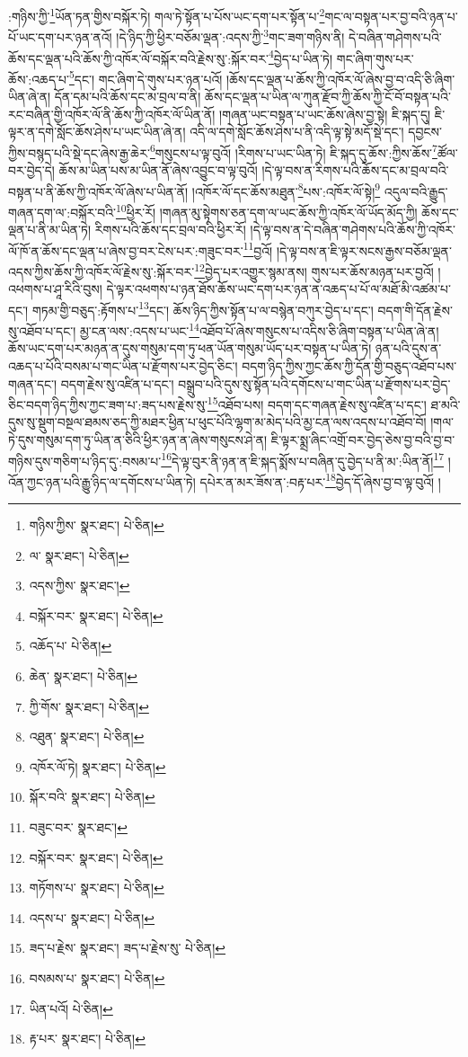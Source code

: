 :གཉིས་ཀྱི་\footnote{གཉིས་ཀྱིས་  སྣར་ཐང་།  པེ་ཅིན། }ཡོན་ཏན་གྱིས་བསྐོར་ཏེ། གལ་ཏེ་སྟོན་པ་པོས་ཡང་དག་པར་སྟོན་པ་\footnote{ལ་  སྣར་ཐང་།  པེ་ཅིན། }གང་ལ་བསྟན་པར་བྱ་བའི་ཉན་པ་པོ་ཡང་དག་པར་ཉན་ནའོ། །དེ་ཉིད་ཀྱི་ཕྱིར་བཅོམ་ལྡན་:འདས་ཀྱི་\footnote{འདས་ཀྱིས་  སྣར་ཐང་། }གང་ཟག་གཉིས་ནི། དེ་བཞིན་གཤེགས་པའི་ཆོས་དང་ལྡན་པའི་ཆོས་ཀྱི་འཁོར་ལོ་བསྐོར་བའི་རྗེས་སུ་:སྐོར་བར་\footnote{བསྐོར་བར་  སྣར་ཐང་།  པེ་ཅིན། }བྱེད་པ་ཡིན་ཏེ། གང་ཞིག་གུས་པར་ཆོས་:འཆད་པ་\footnote{འཆོད་པ་  པེ་ཅིན། }དང་། གང་ཞིག་དེ་གུས་པར་ཉན་པའོ། །ཆོས་དང་ལྡན་པ་ཆོས་ཀྱི་འཁོར་ལོ་ཞེས་བྱ་བ་འདི་ཅི་ཞིག་ཡིན་ཞེ་ན། དོན་དམ་པའི་ཆོས་དང་མ་བྲལ་བ་ནི། ཆོས་དང་ལྡན་པ་ཡིན་ལ་ཀུན་རྫོབ་ཀྱི་ཆོས་ཀྱི་ངོ་བོ་བསྟན་པའི་རང་བཞིན་གྱི་འཁོར་ལོ་ནི་ཆོས་ཀྱི་འཁོར་ལོ་ཡིན་ནོ། །གཞན་ཡང་བསྟན་པ་ཡང་ཆོས་ཞེས་བྱ་སྟེ། ཇི་སྐད་དུ། ཇི་ལྟར་ན་དགེ་སློང་ཆོས་ཤེས་པ་ཡང་ཡིན་ཞེ་ན། འདི་ལ་དགེ་སློང་ཆོས་ཤེས་པ་ནི་འདི་ལྟ་སྟེ་མདོ་སྡེ་དང་། དབྱངས་ཀྱིས་བསྙད་པའི་སྡེ་དང་ཞེས་རྒྱ་ཆེར་\footnote{ཆེན་  སྣར་ཐང་།  པེ་ཅིན། }གསུངས་པ་ལྟ་བུའོ། །རིགས་པ་ཡང་ཡིན་ཏེ། ཇི་སྐད་དུ་ཆོས་:ཀྱིས་ཆོས་\footnote{ཀྱི་གོས་  སྣར་ཐང་།  པེ་ཅིན། }ཚོལ་བར་བྱེད་དེ། ཆོས་མ་ཡིན་པས་མ་ཡིན་ནོ་ཞེས་འབྱུང་བ་ལྟ་བུའོ། །དེ་ལྟ་བས་ན་རིགས་པའི་ཆོས་དང་མ་བྲལ་བའི་བསྟན་པ་ནི་ཆོས་ཀྱི་འཁོར་ལོ་ཞེས་པ་ཡིན་ནོ། །འཁོར་ལོ་དང་ཆོས་མཐུན་\footnote{འཐུན་  སྣར་ཐང་།  པེ་ཅིན། }པས་:འཁོར་ལོ་སྟེ།\footnote{འཁོར་ལོ་ཏེ།  སྣར་ཐང་།  པེ་ཅིན། } འདུལ་བའི་རྒྱུད་གཞན་དག་ལ་:བསྐོར་བའི་\footnote{སྐོར་བའི་  སྣར་ཐང་།  པེ་ཅིན། }ཕྱིར་རོ། །གཞན་མུ་སྟེགས་ཅན་དག་ལ་ཡང་ཆོས་ཀྱི་འཁོར་ལོ་ཡོད་མོད་ཀྱི། ཆོས་དང་ལྡན་པ་ནི་མ་ཡིན་ཏེ། རིགས་པའི་ཆོས་དང་བྲལ་བའི་ཕྱིར་རོ། །དེ་ལྟ་བས་ན་དེ་བཞིན་གཤེགས་པའི་ཆོས་ཀྱི་འཁོར་ལོ་ཁོ་ན་ཆོས་དང་ལྡན་པ་ཞེས་བྱ་བར་ངེས་པར་:གཟུང་བར་\footnote{བཟུང་བར་  སྣར་ཐང་། }བྱའོ། །དེ་ལྟ་བས་ན་ཇི་ལྟར་སངས་རྒྱས་བཅོམ་ལྡན་འདས་ཀྱིས་ཆོས་ཀྱི་འཁོར་ལོ་རྗེས་སུ་:སྐོར་བར་\footnote{བསྐོར་བར་  སྣར་ཐང་།  པེ་ཅིན། }བྱེད་པར་འགྱུར་སྙམ་ནས། གུས་པར་ཆོས་མཉན་པར་བྱའོ། །འཕགས་པ་ཤཱ་རིའི་བུས། དེ་ལྟར་འཕགས་པ་ཉན་ཐོས་ཆོས་ཡང་དག་པར་ཉན་ན་འཆད་པ་པོ་ལ་མཐོ་མི་འཚམ་པ་དང་། གཏམ་གྱི་བཅུད་:རྟོགས་པ་\footnote{གཏོགས་པ་  སྣར་ཐང་།  པེ་ཅིན། }དང་། ཆོས་ཉིད་ཀྱིས་སྟོན་པ་ལ་བསྙེན་བཀུར་བྱེད་པ་དང་། བདག་གི་དོན་རྗེས་སུ་འཐོབ་པ་དང་། མྱ་ངན་ལས་:འདས་པ་ཡང་\footnote{འདས་པ་  སྣར་ཐང་།  པེ་ཅིན། }འཐོབ་པོ་ཞེས་གསུངས་པ་འདིས་ཅི་ཞིག་བསྟན་པ་ཡིན་ཞེ་ན། ཆོས་ཡང་དག་པར་མཉན་ན་དུས་གསུམ་དག་ཏུ་ཕན་ཡོན་གསུམ་ཡོད་པར་བསྟན་པ་ཡིན་ཏེ། ཉན་པའི་དུས་ན་འཆད་པ་པོའི་བསམ་པ་གང་ཡིན་པ་རྫོགས་པར་བྱེད་ཅིང་། བདག་ཉིད་ཀྱིས་ཀྱང་ཆོས་ཀྱི་དོན་གྱི་བཅུད་འཐོབ་པས་གཞན་དང་། བདག་རྗེས་སུ་འཛིན་པ་དང་། བསྒྲུབ་པའི་དུས་སུ་སྟོན་པའི་དགོངས་པ་གང་ཡིན་པ་རྫོགས་པར་བྱེད་ཅིང་བདག་ཉིད་ཀྱིས་ཀྱང་ཟག་པ་:ཟད་པས་རྗེས་སུ་\footnote{ཟད་པ་རྗེས་  སྣར་ཐང་། ཟད་པ་རྗེས་སུ་  པེ་ཅིན། }འཐོབ་པས། བདག་དང་གཞན་རྗེས་སུ་འཛིན་པ་དང་། ཐ་མའི་དུས་སུ་སྡུག་བསྔལ་ཐམས་ཅད་ཀྱི་མཐར་ཕྱིན་པ་ཕུང་པོའི་ལྷག་མ་མེད་པའི་མྱ་ངན་ལས་འདས་པ་འཐོབ་བོ། །གལ་ཏེ་དུས་གསུམ་དག་ཏུ་ཡིན་ན་ཅིའི་ཕྱིར་ཉན་ན་ཞེས་གསུངས་ཤེ་ན། ཇི་ལྟར་སྨྲ་ཞིང་འགྲོ་བར་བྱེད་ཅེས་བྱ་བའི་བྱ་བ་གཉིས་དུས་གཅིག་པ་ཉིད་དུ་:བསམ་པ་\footnote{བསམས་པ་  སྣར་ཐང་།  པེ་ཅིན། }དེ་ལྟ་བུར་ནི་ཉན་ན་ཇི་སྐད་སྨོས་པ་བཞིན་དུ་བྱེད་པ་ནི་མ་:ཡིན་ནོ།\footnote{ཡིན་པའོ།  པེ་ཅིན། } །འོན་ཀྱང་ཉན་པའི་རྒྱུ་ཉིད་ལ་དགོངས་པ་ཡིན་ཏེ། དཔེར་ན་མར་ཟོས་ན་:བརྟ་པར་\footnote{རྟ་པར་  སྣར་ཐང་།  པེ་ཅིན། }བྱེད་དོ་ཞེས་བྱ་བ་ལྟ་བུའོ། །
